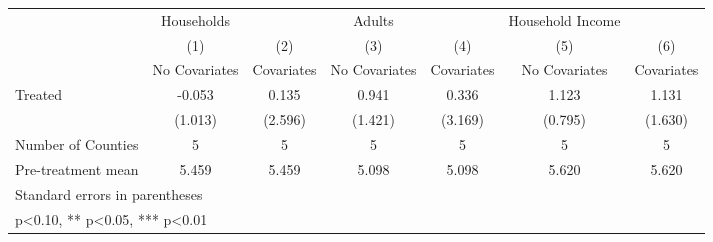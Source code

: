 {
\def\sym#1{\ifmmode^{#1}\else\(^{#1}\)\fi}
\begin{tabular}{l*{6}{c}}
\hline\hline
            &  Households   &               &      Adults   &               &Household Income   &               \\
            &\multicolumn{1}{c}{(1)}&\multicolumn{1}{c}{(2)}&\multicolumn{1}{c}{(3)}&\multicolumn{1}{c}{(4)}&\multicolumn{1}{c}{(5)}&\multicolumn{1}{c}{(6)}\\
            &\multicolumn{1}{c}{No Covariates}&\multicolumn{1}{c}{Covariates}&\multicolumn{1}{c}{No Covariates}&\multicolumn{1}{c}{Covariates}&\multicolumn{1}{c}{No Covariates}&\multicolumn{1}{c}{Covariates}\\
\hline
Treated     &      -0.053   &       0.135   &       0.941   &       0.336   &       1.123   &       1.131   \\
            &     (1.013)   &     (2.596)   &     (1.421)   &     (3.169)   &     (0.795)   &     (1.630)   \\
\hline
Number of Counties&           5   &           5   &           5   &           5   &           5   &           5   \\
Pre-treatment mean&       5.459   &       5.459   &       5.098   &       5.098   &       5.620   &       5.620   \\
\hline\hline
\multicolumn{7}{l}{\footnotesize Standard errors in parentheses}\\
\multicolumn{7}{l}{\footnotesize * p<0.10, ** p<0.05, *** p<0.01}\\
\end{tabular}
}

